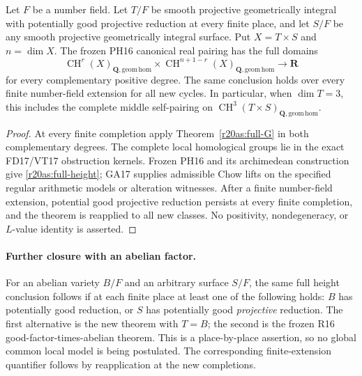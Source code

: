 \begin{corollary}
\label{r20as:height}
Let $F$ be a number field.  Let $T/F$ be smooth projective
geometrically integral with potentially good projective reduction
at every finite place, and let $S/F$ be any smooth projective
geometrically integral surface.  Put $X=T\times S$ and
$n=\dim X$.  The frozen PH16 canonical real pairing has the full
domains
\[
 \operatorname{CH}^r(X)_{\mathbf Q,\mathrm{geom\,hom}}
 \times
 \operatorname{CH}^{n+1-r}(X)_{\mathbf Q,\mathrm{geom\,hom}}
                    \longrightarrow\mathbf R
 \tag{AS20.11}\label{r20as:full-height}
\]
for every complementary positive degree.  The same conclusion
holds over every finite number-field extension for all new cycles.
In particular, when $\dim T=3$, this includes the complete middle
self-pairing on $\operatorname{CH}^3(T\times S)_{\mathbf Q,\mathrm{geom\,hom}}$.
\end{corollary}

\begin{proof}
At every finite completion apply Theorem~\ref{r20as:full-G} in
both complementary degrees.  The complete local homological groups
lie in the exact FD17/VT17 obstruction kernels.  Frozen PH16 and
its archimedean construction give \eqref{r20as:full-height}; GA17
supplies admissible Chow lifts on the specified regular arithmetic
models or alteration witnesses.  After a finite number-field
extension, potential good projective reduction persists at every
finite completion, and the theorem is reapplied to all new classes.
No positivity, nondegeneracy, or $L$-value identity is asserted.
\end{proof}

\paragraph{Further closure with an abelian factor.}
For an abelian variety $B/F$ and an arbitrary surface $S/F$, the
same full height conclusion follows if at each finite place at
least one of the following holds: $B$ has potentially good
reduction, or $S$ has potentially good \emph{projective} reduction.
The first alternative is the new theorem with $T=B$; the second
is the frozen R16 good-factor-times-abelian theorem.  This is a
place-by-place assertion, so no global common local model is being
postulated.  The corresponding finite-extension quantifier follows
by reapplication at the new completions.

